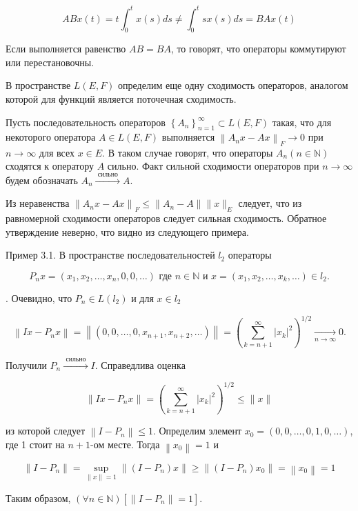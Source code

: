 $$
	A B x(t)=t \int_{0}^{t} x(s) d s \neq \int_{0}^{t} s x(s) d s=B A x(t)
$$

Если выполняется равенство $A B=B A$, то говорят, что операторы коммутируют или перестановочны.

В пространстве $L(E, F)$ определим еще одну сходимость операторов, аналогом которой для функций является поточечная сходимость.

Пусть последовательность операторов $\left\{A_{n}\right\}_{n=1}^{\infty} \subset L(E, F)$ такая, что для некоторого оператора $A \in L(E, F)$ выполняется $\left\|A_{n} x-A x\right\|_{F} \rightarrow 0$ при $n \rightarrow \infty$ для всех $x \in E$. В таком случае говорят, что операторы $A_{n}(n \in \mathbb{N})$ сходятся к оператору $A$ сильно. Факт сильной сходимости операторов при $n \rightarrow \infty$ будем обозначать $A_{n} \stackrel{\text { сильно }}{\longrightarrow} A$.

Из неравенства $\left\|A_{n} x-A x\right\|_{F} \leq\left\|A_{n}-A\right\|\|x\|_{E}$ следует, что из равномерной сходимости операторов следует сильная сходимость. Обратное утверждение неверно, что видно из следующего примера.

Пример 3.1. В пространстве последовательностей $l_{2}$ операторы

$$
	P_{n} x=\left(x_{1}, x_{2}, \ldots, x_{n}, 0,0, \ldots\right) \text { где } n \in \mathbb{N} \text { и } x=\left(x_{1}, x_{2}, \ldots, x_{k}, \ldots\right) \in l_{2} .
$$

. Очевидно, что $P_{n} \in L\left(l_{2}\right)$ и для $x \in l_{2}$

$$
	\left\|I x-P_{n} x\right\|=\left\|\left(0,0, \ldots, 0, x_{n+1}, x_{n+2}, \ldots\right)\right\|=\left(\sum_{k=n+1}^{\infty}\left|x_{k}\right|^{2}\right)^{1 / 2} \underset{n \rightarrow \infty}{\longrightarrow} 0 .
$$

Получили $P_{n} \stackrel{\text { сильно }}{\longrightarrow} I$. Справедлива оценка

$$
	\left\|I x-P_{n} x\right\|=\left(\sum_{k=n+1}^{\infty}\left|x_{k}\right|^{2}\right)^{1 / 2} \leq\|x\|
$$

из которой следует $\left\|I-P_{n}\right\| \leq 1$. Определим элемент $x_{0}=(0,0, \ldots, 0,1,0, \ldots)$, где 1 стоит на $n+1$-ом месте. Тогда $\left\|x_{0}\right\|=1$ и

$$
\left\|I-P_{n}\right\|=\sup _{\|x\|=1}\left\|\left(I-P_{n}\right) x\right\| \geq\left\|\left(I-P_{n}\right) x_{0}\right\|=\left\|x_{0}\right\|=1
$$

Таким образом, $(\forall n \in \mathbb{N})\left[\left\|I-P_{n}\right\|=1\right]$.

